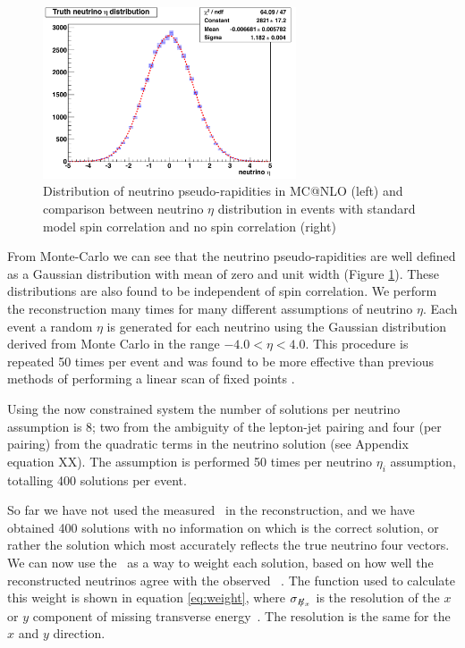       \begin{figure}[h!]
      \begin{center}
     
      \includegraphics[width=75mm]{f/truth_neutrino_eta}
     
      \caption{Distribution of neutrino pseudo-rapidities in MC@NLO (left) and comparison between neutrino $\eta$ distribution in events with standard model spin correlation and no spin correlation (right)}
      \label{fig:nu_dist}
      \end{center}
      \end{figure}

     
      From Monte-Carlo we can see that the neutrino pseudo-rapidities are well defined as a Gaussian distribution with mean of zero and unit width (Figure \ref{fig:nu_dist}). These distributions are also found to be independent of spin correlation. We perform the reconstruction many times for many different assumptions of neutrino $\eta$. Each event a random $\eta$ is generated for each neutrino using the Gaussian distribution derived from Monte Carlo in the range $-4.0 < \eta < 4.0$. This procedure is repeated 50 times per event and was found to be more effective than previous methods of performing a linear scan of fixed points \cite{Meyer:2007zz}. 

Using the now constrained system the number of solutions per neutrino assumption is 8; two from the ambiguity of the lepton-jet pairing and four (per pairing) from the quadratic terms in the neutrino solution (see Appendix equation XX). The assumption is performed 50 times per neutrino $\eta_i$ assumption, totalling 400 solutions per event.
     
So far we have not used the measured \etmiss\ in the reconstruction, and we have obtained 400 solutions with no information on which is the correct solution, or rather the solution which most accurately reflects the true neutrino four vectors. We can now use the \etmiss\ as a way to weight each solution, based on how well the reconstructed neutrinos agree with the observed \etmiss\ . The function used to calculate this weight is shown in equation \ref{eq:weight}, where $\sigma_{E\kern-0.4em\slash_{x}}$ is the resolution of the $x$ or $y$ component of missing transverse energy~\cite{nuWtmass}. The resolution is the same for the $x$ and $y$ direction.

